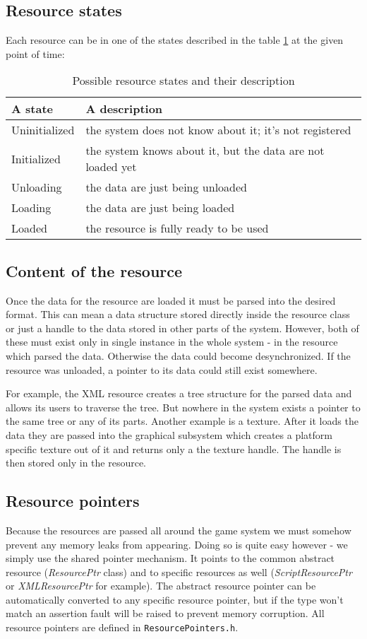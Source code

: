 \subsection{Resource states}
Each resource can be in one of the states described in the table \ref{tab:resource-states} at the given point of time:
\begin{table}[htbp]
	\centering
	{\scriptsize 
	\begin{tabular}{|p{0.13\hsize}|p{0.58\hsize}|}
	  \hline
	  A state & A description \\
		\hline
		Uninitialized & the system does not know about it; it's not registered \\
		Initialized & the system knows about it, but the data are not loaded yet \\
		Unloading & the data are just being unloaded \\
		Loading & the data are just being loaded \\
		Loaded & the resource is fully ready to be used \\
		\hline
	\end{tabular}
	}
	\caption[Possible resource states]{Possible resource states and their description}
	\label{tab:resource-states}
\end{table}

\subsection{Content of the resource}
Once the data for the resource are loaded it must be parsed into the desired format. This can mean a data structure stored directly inside the resource class or just a handle to the data stored in other parts of the system. However, both of these must exist only in single instance in the whole system - in the resource which parsed the data. Otherwise the data could become desynchronized. If the resource was unloaded, a pointer to its data could still exist somewhere. 

For example, the XML resource creates a tree structure for the parsed data and allows its users to traverse the tree. But nowhere in the system exists a pointer to the same tree or any of its parts. Another example is a texture. After it loads the data they are passed into the graphical subsystem which creates a platform specific texture out of it and returns only a the texture handle. The handle is then stored only in the resource.

\subsection{Resource pointers}
Because the resources are passed all around the game system we must somehow prevent any memory leaks from appearing. Doing so is quite easy however - we simply use the shared pointer mechanism. It points to the common abstract resource (\emph{ResourcePtr} class) and to specific resources as well (\emph{ScriptResourcePtr} or \emph{XMLResourcePtr} for example). The abstract resource pointer can be automatically converted to any specific resource pointer, but if the type won't match an assertion fault will be raised to prevent memory corruption. All resource pointers are defined in \verb'ResourcePointers.h'.


